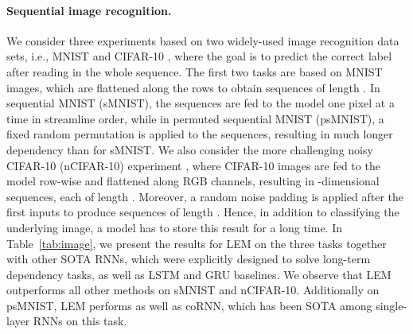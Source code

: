 \documentclass{article} \usepackage{iclr2022_conference,times}
\newcommand{\Tref}[1]{Table~\ref{#1}}
\begin{document}
\paragraph{Sequential image recognition.}
We consider three experiments based on two widely-used image recognition data sets, i.e., MNIST \citep{mnist} and CIFAR-10 \citep{cifar}, where the goal is to predict the correct label after reading in the whole sequence. The first two tasks are based on MNIST images, which are flattened along the rows to obtain sequences of length . In sequential MNIST (sMNIST), the sequences are fed to the model one pixel at a time in streamline order, while in permuted sequential MNIST (psMNIST), a fixed random permutation is applied to the sequences, resulting in much longer dependency than for sMNIST. We also consider the more challenging noisy CIFAR-10 (nCIFAR-10) experiment \citep{anti}, where CIFAR-10 images are fed to the model row-wise and flattened along RGB channels, resulting in -dimensional sequences, each of length . Moreover, a random noise padding is applied after the first  inputs to produce sequences of length . Hence, in addition to classifying the underlying image, a model has to store this result for a long time. In \Tref{tab:image}, we present the results for LEM on the three tasks together with other SOTA RNNs, which were explicitly designed to solve long-term dependency tasks, as well as LSTM and GRU baselines. We observe that LEM outperforms all other methods on sMNIST and nCIFAR-10. Additionally on psMNIST, LEM performs as well as coRNN, which has been SOTA among single-layer RNNs on this task.
\end{document}
